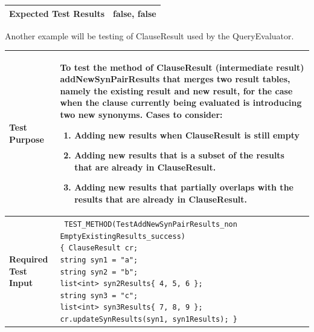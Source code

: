 \documentclass[12pt]{article}
\begin{document}
{{{{{{{{{{{{{\begin{longtable}{|L{5cm} | L{12.5cm}| }
 \\\hline
   \textbf{ Expected Test Results} &
false, false\\\hline
\end{longtable}

Another example will be testing of ClauseResult used by the QueryEvaluator. \newline

\begin{longtable}{|L{5cm} | L{12cm}| }
\hline
\textbf{Test Purpose} &
To test the method of ClauseResult (intermediate result) addNewSynPairResults that merges two result tables, namely the existing result and new result, for the case when the clause currently being evaluated is introducing two new synonyms.
\newline \vspace{2mm}
Cases to consider: 
\begin{enumerate}
\item Adding new results when ClauseResult is still empty
\item Adding new results that is a subset of the results that are already in ClauseResult.
\item Adding new results that partially overlaps with the results that are already in ClauseResult. 
\end{enumerate}
\\\hline
\textbf{Required Test Input}
 &
 \texttt{
 \noindent TEST\_METHOD(TestAddNewSynPairResults\_non
 EmptyExistingResults\_success)
\newline \vspace{2mm}
 \{ \hspace{4mm} ClauseResult cr; \newline \vspace{2mm}
 \hspace{9mm} string syn1 = "a"; \newline 
    \hspace{9mm}  string syn2 = "b"; \newline 
	\hspace{9mm}        list<int> syn2Results\{ 4, 5, 6 \}; \newline
	\hspace{9mm}      string syn3 = "c"; \newline
	\hspace{9mm} list<int> syn3Results\{ 7, 8, 9 \}; \newline
	\hspace{9mm}  cr.updateSynResults(syn1, syn1Results); \} }
    

\end{longtable}}}}}}}}}}}}}}
\end{document}
